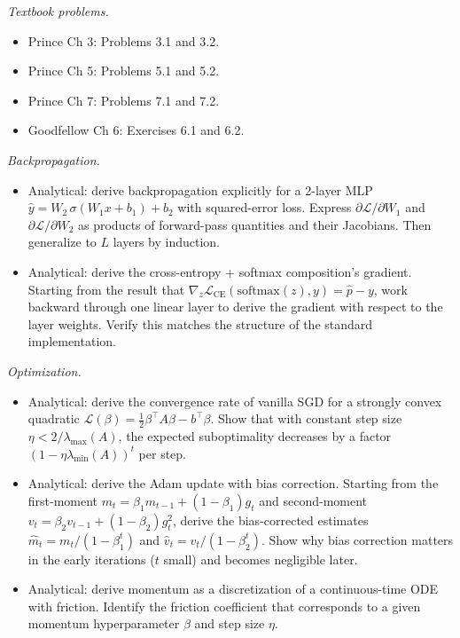 \emph{Textbook problems.}

\begin{itemize}
\tightlist
\item
  Prince Ch 3: Problems 3.1 and 3.2.
\item
  Prince Ch 5: Problems 5.1 and 5.2.
\item
  Prince Ch 7: Problems 7.1 and 7.2.
\item
  Goodfellow Ch 6: Exercises 6.1 and 6.2.
\end{itemize}

\emph{Backpropagation.}

\begin{itemize}
\tightlist
\item
  Analytical: derive backpropagation explicitly for a 2-layer MLP
  \(\hat{y} = W_2 \, \sigma(W_1 x + b_1) + b_2\) with squared-error
  loss. Express \(\partial \mathcal{L} / \partial W_1\) and
  \(\partial \mathcal{L} / \partial W_2\) as products of forward-pass
  quantities and their Jacobians. Then generalize to \(L\) layers by
  induction.
\item
  Analytical: derive the cross-entropy + softmax composition's gradient.
  Starting from the result that
  \(\nabla_z \mathcal{L}_{\text{CE}}(\text{softmax}(z), y) = \hat{p} - y\),
  work backward through one linear layer to derive the gradient with
  respect to the layer weights. Verify this matches the structure of the
  standard implementation.
\end{itemize}

\emph{Optimization.}

\begin{itemize}
\tightlist
\item
  Analytical: derive the convergence rate of vanilla SGD for a strongly
  convex quadratic
  \(\mathcal{L}(\beta) = \tfrac{1}{2} \beta^\top A \beta - b^\top \beta\).
  Show that with constant step size \(\eta < 2/\lambda_{\max}(A)\), the
  expected suboptimality decreases by a factor
  \((1 - \eta \lambda_{\min}(A))^t\) per step.
\item
  Analytical: derive the Adam update with bias correction. Starting from
  the first-moment \(m_t = \beta_1 m_{t-1} + (1-\beta_1) g_t\) and
  second-moment \(v_t = \beta_2 v_{t-1} + (1-\beta_2) g_t^2\), derive
  the bias-corrected estimates \(\hat{m}_t = m_t / (1 - \beta_1^t)\) and
  \(\hat{v}_t = v_t / (1 - \beta_2^t)\). Show why bias correction
  matters in the early iterations (\(t\) small) and becomes negligible
  later.
\item
  Analytical: derive momentum as a discretization of a continuous-time
  ODE with friction. Identify the friction coefficient that corresponds
  to a given momentum hyperparameter \(\beta\) and step size \(\eta\).
\end{itemize}

